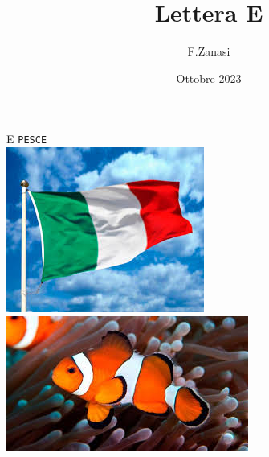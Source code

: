 \documentclass[]{article}
\title{Lettera E}
\author{F.Zanasi}
\date{Ottobre 2023}
\begin{document}
{\fontsize{150}{160}\selectfont E} 
\hspace{2.0in}
{\fontsize{80}{80}\color{black}\texttt{P}\color{blue}\texttt{E}\color{black}\texttt{SC}\color{blue}\texttt{E}} 
\\[2cm]
\includegraphics[scale=0.3]{flag-IT1}
\includegraphics[scale=0.4]{pesce}
\end{document}
